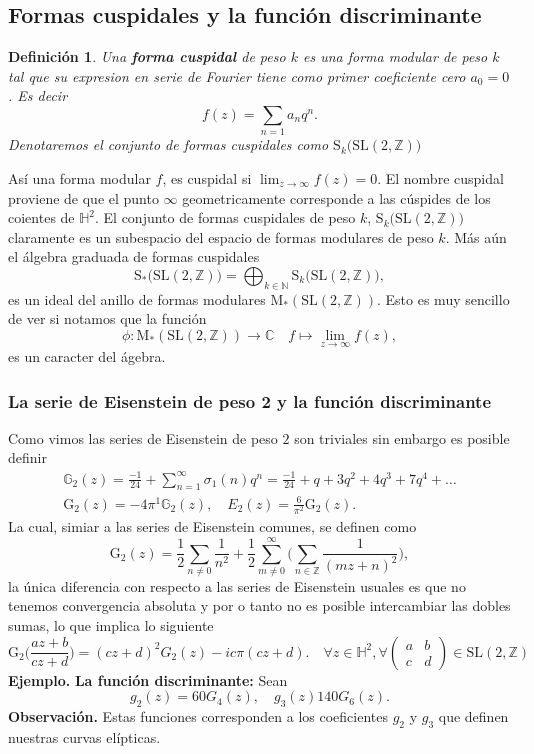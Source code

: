 \documentclass[letterpaper]{article}
\newtheorem{def.}{Definici\'on}[section]
\newcommand{\zah}{\ensuremath{ \mathbb Z }}
\newcommand{\nat}{\ensuremath{ \mathbb N }}
\newcommand{\eje}{{\noindent \sc \textbf{Ejemplo. }}}
\newcommand{\obs}{{\noindent \sc \textbf{Observación. }}}
\newcommand{\co}{\ensuremath{\mathbb C }}
\newcommand{\hd}{\ensuremath{\mathbb H^2}}
\newcommand{\slz}{\ensuremath{\mathrm{SL}(2,\mathbb Z) }}
\newcommand{\mdlr}{\ensuremath{\mathrm{M}}}
\begin{document}
\subsection{Formas cuspidales y la función discriminante}
\begin{def.}
Una \textbf{forma cuspidal} de peso \(k\) es una forma modular de peso \(k\) tal que su expresion en serie de Fourier tiene como primer coeficiente cero \(a_0=0\). Es decir
\[
    f(z)=\sum_{n=1}a_nq^n.
\]
Denotaremos el conjunto de formas cuspidales como \(\mathrm{S}_k\big(\slz\big)\)
\end{def.}
Así una forma modular \(f\), es cuspidal si \(\lim_{z\rightarrow\infty}f(z)=0\). El nombre cuspidal proviene de que el punto \(\infty\) geometricamente corresponde a las cúspides de los coientes de \(\hd\). El conjunto de formas cuspidales de peso \(k\), \(\mathrm{S}_k\big(\slz\big)\) claramente es un subespacio del espacio de formas modulares de peso \(k\). Más aún el álgebra graduada de formas cuspidales
\[
    \mathrm{S}_{*}\big(\slz\big)=\bigoplus_{k\in\nat}\mathrm{S}_k\big(\slz\big),
\]
\noindent es un ideal del anillo de formas modulares \(\mdlr_{*}(\slz)\). Esto es muy sencillo de ver si notamos que la función
\[
    \phi:\mdlr_{*}(\slz)\rightarrow\co\quad f\mapsto\lim_{z\rightarrow\infty}f(z),
\]
\noindent es un caracter del ágebra.
\subsubsection{La serie de Eisenstein de peso 2 y la función discriminante}
\noindent Como vimos las series de Eisenstein de peso \(2\) son triviales sin embargo es posible definir
\begin{align*}
 \mathbb{G}_2(z)=\frac{-1}{24}+\sum_{n=1}^{\infty}\sigma_1(n)q^n=\frac{-1}{24}+q+3q^2+4q^3+7q^4+\dots\\
 \mathrm{G}_2(z)=-4\pi^1\mathbb{G}_2(z),\quad E_2(z)=\frac{6}{\pi^2}\mathrm{G}_2(z).
\end{align*}
La cual, simiar a las series de Eisenstein comunes, se definen como
\[
\mathrm{G}_2(z)=\frac{1}{2}\sum_{n\neq 0}\frac{1}{n^2}+\frac{1}{2}\sum_{m\neq0}^{\infty}\Big(\sum_{n\in\zah}\frac{1}{(mz+n)^2}\Big),
\]
la única diferencia con respecto a las series de Eisenstein usuales es que no tenemos convergencia absoluta y por o tanto no es posible intercambiar las dobles sumas, lo que implica lo siguiente
\begin{equation}
\mathrm{G}_2\Big(\frac{az+b}{cz+d}\Big)=(cz+d)^2G_2(z)-ic\pi(cz+d).\quad\forall z\in\hd,\forall\begin{pmatrix}a & b\\ c & d \end{pmatrix}\in\slz
\end{equation}
\eje \textbf{La función discriminante:} Sean
\[
    g_2(z)=60G_4(z),\quad g_3(z)140G_6(z).
\]
\obs Estas funciones corresponden a los coeficientes \(g_2\) y \(g_3\) que definen nuestras curvas elípticas.
\end{document}
